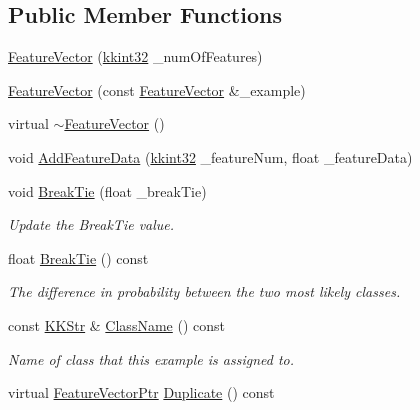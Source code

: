 \subsection*{Public Member Functions}
\begin{DoxyCompactItemize}
\item 
\hyperlink{class_k_k_m_l_l_1_1_feature_vector_ab23e7e43c120fb8195099e73bddef17c}{Feature\+Vector} (\hyperlink{namespace_k_k_b_a8fa4952cc84fda1de4bec1fbdd8d5b1b}{kkint32} \+\_\+num\+Of\+Features)
\item 
\hyperlink{class_k_k_m_l_l_1_1_feature_vector_a2fd40e7ca7507f929a5bdad350540986}{Feature\+Vector} (const \hyperlink{class_k_k_m_l_l_1_1_feature_vector}{Feature\+Vector} \&\+\_\+example)
\item 
virtual \hyperlink{class_k_k_m_l_l_1_1_feature_vector_a1b0407e6c3a5a0154a43e138972f7ee7}{$\sim$\+Feature\+Vector} ()
\item 
void \hyperlink{class_k_k_m_l_l_1_1_feature_vector_abf364e3348c041cd7be6f14d6c4567cf}{Add\+Feature\+Data} (\hyperlink{namespace_k_k_b_a8fa4952cc84fda1de4bec1fbdd8d5b1b}{kkint32} \+\_\+feature\+Num, float \+\_\+feature\+Data)
\item 
void \hyperlink{class_k_k_m_l_l_1_1_feature_vector_a99d8b97d7209be16e9e6fe959cb00891}{Break\+Tie} (float \+\_\+break\+Tie)
\begin{DoxyCompactList}\small\item\em Update the Break\+Tie value. \end{DoxyCompactList}\item 
float \hyperlink{class_k_k_m_l_l_1_1_feature_vector_abe86a79f606161cfa516ab66d2cc5941}{Break\+Tie} () const 
\begin{DoxyCompactList}\small\item\em The difference in probability between the two most likely classes. \end{DoxyCompactList}\item 
const \hyperlink{class_k_k_b_1_1_k_k_str}{K\+K\+Str} \& \hyperlink{class_k_k_m_l_l_1_1_feature_vector_a7c410c4ab70f5f2fdc8fca66ea8000ba}{Class\+Name} () const 
\begin{DoxyCompactList}\small\item\em Name of class that this example is assigned to. \end{DoxyCompactList}\item 
virtual \hyperlink{class_k_k_m_l_l_1_1_feature_vector_a56571234d7b7fae4f6940ed9640aabf4}{Feature\+Vector\+Ptr} \hyperlink{class_k_k_m_l_l_1_1_feature_vector_a7be1e7f38a9d57f3be9bea904cf60be9}{Duplicate} () const 

\end{DoxyCompactItemize}
